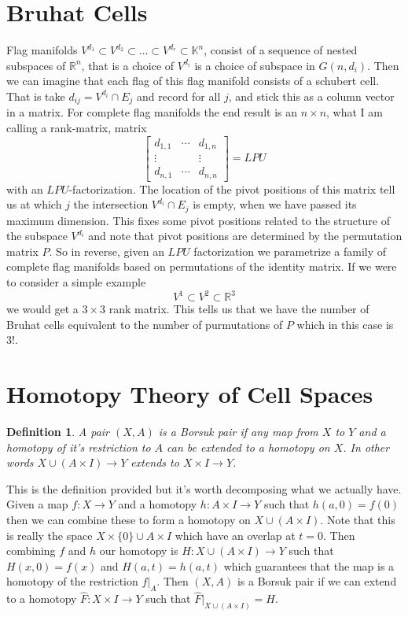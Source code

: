 \documentclass[40pt]{article}
\newtheorem{definition}{Definition}[section]
\newcommand{\R}{\mathbb{R}}
\begin{document}
		\section{Bruhat Cells}
		Flag manifolds $V^{d_1} \subset V^{d_2} \subset \dots \subset V^{d_r} \subset \mathbb{K}^n$, consist of a sequence of nested subspaces of $\R^n$, that is a choice of $V^{d_i}$ is a choice of subspace in $ G(n,d_i )$. Then we can imagine that each flag of this flag manifold consists of a schubert cell. That is take $d_{ij} = V^{d_i} \cap E_j$ and record for all $j$, and stick this as a column vector in a matrix. For complete flag manifolds the end result is an $n \times n$, what I am calling a rank-matrix, matrix
		\[
		\begin{bmatrix}
			d_{1,1} & \cdots & d_{1,n} \\
			\vdots & & \vdots \\
			d_{n,1} & \cdots & d_{n,n}
		\end{bmatrix} = LPU
		\]
		with an $LPU$-factorization. The location of the pivot positions of this matrix tell us at which $j$ the intersection $V^{d_i} \cap E_j$ is empty, when we have passed its maximum dimension. This fixes some pivot positions related to the structure of the subspace $V^{d_i}$ and note that pivot positions are determined by the permutation matrix $P$. So in reverse, given an $LPU$ factorization we parametrize a family of complete flag manifolds based on permutations of the identity matrix. If we were to consider a simple example 
		\[
		V^1 \subset V^2 \subset \R^3
		\]
		we would get a $3 \times 3$ rank matrix. This tells us that we have the number of Bruhat cells equivalent to the number of purmutations of $P$ which in this case is $3!$.  
		
		\section{Homotopy Theory of Cell Spaces}
		\begin{definition}
			A pair $(X,A)$ is a Borsuk pair if any map from $X$ to $Y$ and a homotopy of it's restriction to $A$ can be extended to a homotopy on $X$. In other words $X \cup (A \times I) \rightarrow Y$ extends to $X \times I \rightarrow Y$. 
		\end{definition}
		This is the definition provided but it's worth decomposing what we actually have. Given a map $f: X \rightarrow Y$ and a homotopy $h : A \times I \rightarrow Y$ such that $h(a,0) = f(0)$ then we can combine these to form a homotopy on $X \cup (A \times I)$. Note that this is really the space $X \times \{0\} \cup A \times I$ which have an overlap at $t = 0$. Then combining $f$ and $h$ our homotopy is $H : X \cup (A \times I) \rightarrow Y$ such that $H(x,0) = f(x)$ and $H(a,t) = h(a,t)$ which guarantees that the map is a homotopy of the restriction $f|_A$. Then $(X,A)$ is a Borsuk pair if we can extend to a homotopy $\hat F : X \times I \rightarrow Y$ such that $\hat{F}|_{X \cup (A \times I)} = H$. 
		
\end{document}
